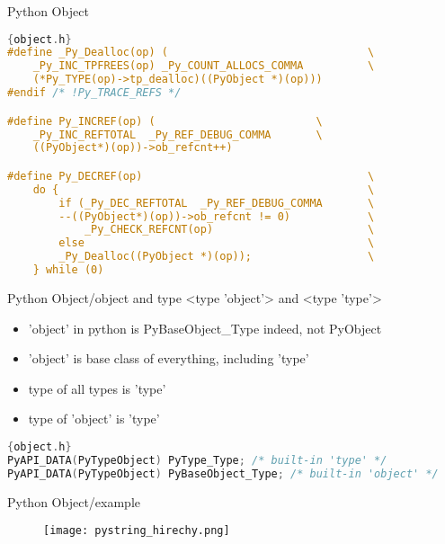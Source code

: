 \documentclass[xcolor=svgnames]{beamer}
\begin{document}
\begin{frame}[fragile]{Python Object}
    \begin{lstlisting}[language=C]{object.h}
#define _Py_Dealloc(op) (                               \
    _Py_INC_TPFREES(op) _Py_COUNT_ALLOCS_COMMA          \
    (*Py_TYPE(op)->tp_dealloc)((PyObject *)(op)))
#endif /* !Py_TRACE_REFS */

#define Py_INCREF(op) (                         \
    _Py_INC_REFTOTAL  _Py_REF_DEBUG_COMMA       \
    ((PyObject*)(op))->ob_refcnt++)

#define Py_DECREF(op)                                   \
    do {                                                \
        if (_Py_DEC_REFTOTAL  _Py_REF_DEBUG_COMMA       \
        --((PyObject*)(op))->ob_refcnt != 0)            \
            _Py_CHECK_REFCNT(op)                        \
        else                                            \
        _Py_Dealloc((PyObject *)(op));                  \
    } while (0)
\end{lstlisting} 
\end{frame}


\begin{frame}[fragile]{Python Object/object and type}
    <type 'object'> and <type 'type'>
    \begin{itemize}
        \item 'object' in python is PyBaseObject\_Type indeed, not PyObject
        \item 'object' is base class of everything, including 'type'
        \item type of all types is 'type'
        \item type of 'object' is 'type'
    \end{itemize}
    \begin{lstlisting}[language=C]{object.h}
PyAPI_DATA(PyTypeObject) PyType_Type; /* built-in 'type' */
PyAPI_DATA(PyTypeObject) PyBaseObject_Type; /* built-in 'object' */
    \end{lstlisting} 
\end{frame}

\begin{frame}[fragile]{Python Object/example}
    \begin{figure}
       \begin{center}
       \texttt{[image: pystring\_hirechy.png]}
       \end{center}
\end{figure}
\end{frame}
\end{document}

